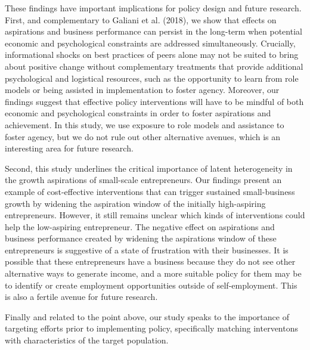\documentclass[11.5pt]{article}
\begin{document}
These findings have important implications for policy design and future research. First, and complementary to Galiani et al. (2018), we show that effects on aspirations and business performance can persist in the long-term when potential economic and psychological constraints are addressed simultaneously. Crucially, informational shocks on best practices of peers alone may not be suited to bring about positive change without complementary treatments that provide additional psychological and logistical resources, such as the opportunity to learn from role models or being assisted in implementation to foster agency. Moreover, our findings suggest that effective policy interventions will have to be mindful of both economic and psychological constraints in order to foster aspirations and achievement. In this study, we use exposure to role models and assistance to foster agency, but we do not rule out other alternative avenues, which is an interesting area for future research.

Second, this study underlines the critical importance of latent heterogeneity in the growth aspirations of small-scale entrepreneurs. Our findings present an example of cost-effective interventions that can trigger sustained small-business growth by widening the aspiration window of the initially high-aspiring entrepreneurs. However, it still remains unclear which kinds of interventions could help the low-aspiring entrepreneur. The negative effect on aspirations and business performance created by  widening the aspirations window of these entrepreneurs is suggestive of a state of frustration with their businesses. It is possible that these entrepreneurs have a business because they do not see other alternative ways to generate income, and a more suitable policy for them may be to identify or create employment opportunities outside of self-employment. This is also a fertile avenue for future research.


Finally and related to the point above, our study speaks to the importance of targeting efforts prior to implementing policy, specifically matching interventons with characteristics of the target population.
\end{document}
